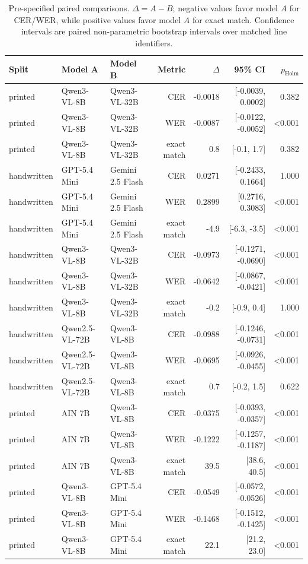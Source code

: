 \begin{table}[t]
\centering
\caption{Pre-specified paired comparisons. $\Delta=A-B$; negative values favor model $A$ for CER/WER, while positive values favor model $A$ for exact match. Confidence intervals are paired non-parametric bootstrap intervals over matched line identifiers.}
\label{tab:app_paired_statistics}
\small
\setlength{\tabcolsep}{3pt}
\begin{tabular}{lllrrrr}
\toprule
Split & Model A & Model B & Metric & $\Delta$ & 95\% CI & $p_{\mathrm{Holm}}$ \\
\midrule
printed & Qwen3-VL-8B & Qwen3-VL-32B & CER & -0.0018 & [-0.0039, 0.0002] & 0.382 \\
printed & Qwen3-VL-8B & Qwen3-VL-32B & WER & -0.0087 & [-0.0122, -0.0052] & <0.001 \\
printed & Qwen3-VL-8B & Qwen3-VL-32B & exact match & 0.8 & [-0.1, 1.7] & 0.382 \\
handwritten & GPT-5.4 Mini & Gemini 2.5 Flash & CER & 0.0271 & [-0.2433, 0.1664] & 1.000 \\
handwritten & GPT-5.4 Mini & Gemini 2.5 Flash & WER & 0.2899 & [0.2716, 0.3083] & <0.001 \\
handwritten & GPT-5.4 Mini & Gemini 2.5 Flash & exact match & -4.9 & [-6.3, -3.5] & <0.001 \\
handwritten & Qwen3-VL-8B & Qwen3-VL-32B & CER & -0.0973 & [-0.1271, -0.0690] & <0.001 \\
handwritten & Qwen3-VL-8B & Qwen3-VL-32B & WER & -0.0642 & [-0.0867, -0.0421] & <0.001 \\
handwritten & Qwen3-VL-8B & Qwen3-VL-32B & exact match & -0.2 & [-0.9, 0.4] & 1.000 \\
handwritten & Qwen2.5-VL-72B & Qwen3-VL-8B & CER & -0.0988 & [-0.1246, -0.0731] & <0.001 \\
handwritten & Qwen2.5-VL-72B & Qwen3-VL-8B & WER & -0.0695 & [-0.0926, -0.0455] & <0.001 \\
handwritten & Qwen2.5-VL-72B & Qwen3-VL-8B & exact match & 0.7 & [-0.2, 1.5] & 0.622 \\
printed & AIN 7B & Qwen3-VL-8B & CER & -0.0375 & [-0.0393, -0.0357] & <0.001 \\
printed & AIN 7B & Qwen3-VL-8B & WER & -0.1222 & [-0.1257, -0.1187] & <0.001 \\
printed & AIN 7B & Qwen3-VL-8B & exact match & 39.5 & [38.6, 40.5] & <0.001 \\
printed & Qwen3-VL-8B & GPT-5.4 Mini & CER & -0.0549 & [-0.0572, -0.0526] & <0.001 \\
printed & Qwen3-VL-8B & GPT-5.4 Mini & WER & -0.1468 & [-0.1512, -0.1425] & <0.001 \\
printed & Qwen3-VL-8B & GPT-5.4 Mini & exact match & 22.1 & [21.2, 23.0] & <0.001 \\
\bottomrule
\end{tabular}
\end{table}
